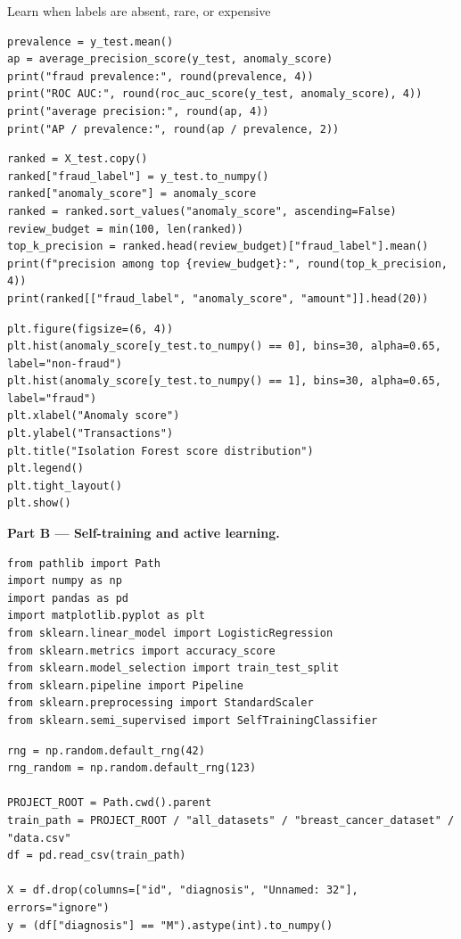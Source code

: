 \begin{labproject}{Learn when labels are absent, rare, or expensive}
\begin{lstlisting}[style=mlpython]
prevalence = y_test.mean()
ap = average_precision_score(y_test, anomaly_score)
print("fraud prevalence:", round(prevalence, 4))
print("ROC AUC:", round(roc_auc_score(y_test, anomaly_score), 4))
print("average precision:", round(ap, 4))
print("AP / prevalence:", round(ap / prevalence, 2))
\end{lstlisting}

\begin{lstlisting}[style=mlpython]
ranked = X_test.copy()
ranked["fraud_label"] = y_test.to_numpy()
ranked["anomaly_score"] = anomaly_score
ranked = ranked.sort_values("anomaly_score", ascending=False)
review_budget = min(100, len(ranked))
top_k_precision = ranked.head(review_budget)["fraud_label"].mean()
print(f"precision among top {review_budget}:", round(top_k_precision, 4))
print(ranked[["fraud_label", "anomaly_score", "amount"]].head(20))
\end{lstlisting}

\begin{lstlisting}[style=mlpython]
plt.figure(figsize=(6, 4))
plt.hist(anomaly_score[y_test.to_numpy() == 0], bins=30, alpha=0.65, label="non-fraud")
plt.hist(anomaly_score[y_test.to_numpy() == 1], bins=30, alpha=0.65, label="fraud")
plt.xlabel("Anomaly score")
plt.ylabel("Transactions")
plt.title("Isolation Forest score distribution")
plt.legend()
plt.tight_layout()
plt.show()
\end{lstlisting}

\medskip\noindent\textbf{Part B --- Self-training and active learning.}\par
\begin{lstlisting}[style=mlpython]
from pathlib import Path
import numpy as np
import pandas as pd
import matplotlib.pyplot as plt
from sklearn.linear_model import LogisticRegression
from sklearn.metrics import accuracy_score
from sklearn.model_selection import train_test_split
from sklearn.pipeline import Pipeline
from sklearn.preprocessing import StandardScaler
from sklearn.semi_supervised import SelfTrainingClassifier
\end{lstlisting}

\begin{lstlisting}[style=mlpython]
rng = np.random.default_rng(42)
rng_random = np.random.default_rng(123)

PROJECT_ROOT = Path.cwd().parent
train_path = PROJECT_ROOT / "all_datasets" / "breast_cancer_dataset" / "data.csv"
df = pd.read_csv(train_path)

X = df.drop(columns=["id", "diagnosis", "Unnamed: 32"], errors="ignore")
y = (df["diagnosis"] == "M").astype(int).to_numpy()
\end{lstlisting}


\end{labproject}
